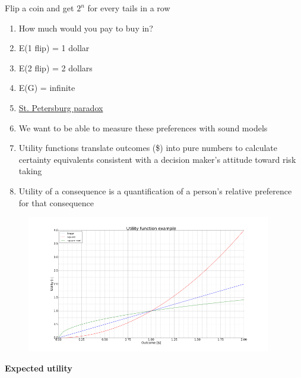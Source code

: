 \documentclass[aspectratio=1610,pdftex,dvipsnames,compress,xcolor={dvipsnames}]{beamer}
\begin{document}
\begin{frame}{Flip a coin and get $2^n$ for every tails in a row}
    \begin{enumerate}[series=outerlist,topsep=0pt,itemsep=11pt,leftmargin=*,label=(\arabic*)]
        \item[]How much would you pay to buy in?  
        \item[]E(1 flip) = 1 dollar    
        \item[]E(2 flip) = 2 dollars    
        \item[]E(G) = infinite  
        \item[]\href{https://policonomics.com/saint-petersburg-paradox/}{St. Petersburg paradox}
        \item[]We want to be able to measure these preferences with sound models
        \item[]Utility functions translate outcomes (\$) into pure numbers to calculate certainty equivalents consistent with a decision maker's attitude toward risk taking
        \item[]Utility of a consequence is a quantification of a person's relative preference for that consequence
    \end{enumerate}
\end{frame}


\begin{frame}{}
    \begin{figure}
        \centering
        \includegraphics[width=0.95\textwidth]{utility.function.example.jpg}
    \end{figure}
\end{frame}


\begin{frame}[plain]{}
    \centering\LARGE\textbf{Expected utility}
\end{frame}
\end{document}
